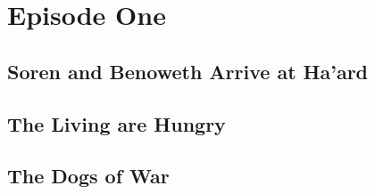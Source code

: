 \documentclass[././main.tex]{subfiles}
\begin{document}
\section{Episode One}
\subsection{Soren and Benoweth Arrive at Ha'ard}
\subsection{The Living are Hungry}
\subsection{The Dogs of War}
\end{document}
